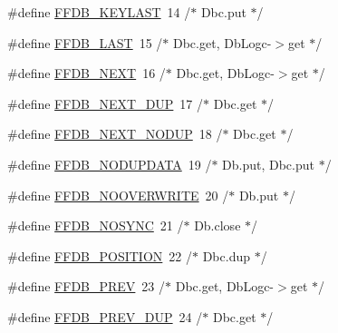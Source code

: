 \begin{DoxyCompactItemize}
\item 
\#define \mbox{\hyperlink{adat-devel_2other__libs_2filedb_2filehash_2ffdb__db_8h_a3adc1026ba3dc7f31f4ecce68a7af4ee}{F\+F\+D\+B\+\_\+\+K\+E\+Y\+L\+A\+ST}}~14	/$\ast$ Dbc.\+put $\ast$/
\item 
\#define \mbox{\hyperlink{adat-devel_2other__libs_2filedb_2filehash_2ffdb__db_8h_ac5bcafe8cd508212cb321a11057fc83c}{F\+F\+D\+B\+\_\+\+L\+A\+ST}}~15	/$\ast$ Dbc.\+get, Db\+Logc-\/$>$get $\ast$/
\item 
\#define \mbox{\hyperlink{adat-devel_2other__libs_2filedb_2filehash_2ffdb__db_8h_a5e1eecf29a0962ccaba97b93ceea92c0}{F\+F\+D\+B\+\_\+\+N\+E\+XT}}~16	/$\ast$ Dbc.\+get, Db\+Logc-\/$>$get $\ast$/
\item 
\#define \mbox{\hyperlink{adat-devel_2other__libs_2filedb_2filehash_2ffdb__db_8h_ad160afb37f043e7ca30f3225ee186491}{F\+F\+D\+B\+\_\+\+N\+E\+X\+T\+\_\+\+D\+UP}}~17	/$\ast$ Dbc.\+get $\ast$/
\item 
\#define \mbox{\hyperlink{adat-devel_2other__libs_2filedb_2filehash_2ffdb__db_8h_a9504725536ccfa7adc55373ad0cab34a}{F\+F\+D\+B\+\_\+\+N\+E\+X\+T\+\_\+\+N\+O\+D\+UP}}~18	/$\ast$ Dbc.\+get $\ast$/
\item 
\#define \mbox{\hyperlink{adat-devel_2other__libs_2filedb_2filehash_2ffdb__db_8h_ae92a3b081c44c4a6765200b3ebfd101f}{F\+F\+D\+B\+\_\+\+N\+O\+D\+U\+P\+D\+A\+TA}}~19	/$\ast$ Db.\+put, Dbc.\+put $\ast$/
\item 
\#define \mbox{\hyperlink{adat-devel_2other__libs_2filedb_2filehash_2ffdb__db_8h_a7860c04b70c5c1ce16e9da5184bd3a78}{F\+F\+D\+B\+\_\+\+N\+O\+O\+V\+E\+R\+W\+R\+I\+TE}}~20	/$\ast$ Db.\+put $\ast$/
\item 
\#define \mbox{\hyperlink{adat-devel_2other__libs_2filedb_2filehash_2ffdb__db_8h_a5ab87fbbabb8efe2d897a1104dbe16a9}{F\+F\+D\+B\+\_\+\+N\+O\+S\+Y\+NC}}~21	/$\ast$ Db.\+close $\ast$/
\item 
\#define \mbox{\hyperlink{adat-devel_2other__libs_2filedb_2filehash_2ffdb__db_8h_a2bc68e89a9bfd54b46af4285cc256b2b}{F\+F\+D\+B\+\_\+\+P\+O\+S\+I\+T\+I\+ON}}~22	/$\ast$ Dbc.\+dup $\ast$/
\item 
\#define \mbox{\hyperlink{adat-devel_2other__libs_2filedb_2filehash_2ffdb__db_8h_a402585e9860864934d929e4b2ba0a1b9}{F\+F\+D\+B\+\_\+\+P\+R\+EV}}~23	/$\ast$ Dbc.\+get, Db\+Logc-\/$>$get $\ast$/
\item 
\#define \mbox{\hyperlink{adat-devel_2other__libs_2filedb_2filehash_2ffdb__db_8h_a233ed3a3112a09875ff794f696cf2b7e}{F\+F\+D\+B\+\_\+\+P\+R\+E\+V\+\_\+\+D\+UP}}~24	/$\ast$ Dbc.\+get $\ast$/

\end{DoxyCompactItemize}
